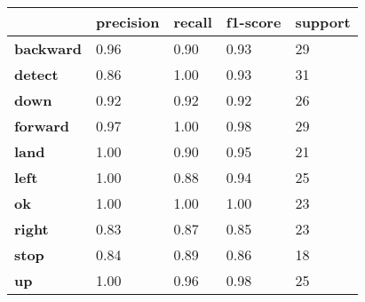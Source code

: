 \begin{table}[htb]
    \centering
    \begin{tabular}{|lllll|}
        \hline
        \multicolumn{1}{|l|}{\textbf{}}             & \multicolumn{1}{l|}{\textbf{precision}} & \multicolumn{1}{l|}{\textbf{recall}} & \multicolumn{1}{l|}{\textbf{f1-score}} & \textbf{support} \\ \hline
        \multicolumn{1}{|l|}{\textbf{backward}}     & \multicolumn{1}{l|}{0.96}               & \multicolumn{1}{l|}{0.90}            & \multicolumn{1}{l|}{0.93}              & 29               \\ \hline
        \multicolumn{1}{|l|}{\textbf{detect}}       & \multicolumn{1}{l|}{0.86}               & \multicolumn{1}{l|}{1.00}            & \multicolumn{1}{l|}{0.93}              & 31               \\ \hline
        \multicolumn{1}{|l|}{\textbf{down}}         & \multicolumn{1}{l|}{0.92}               & \multicolumn{1}{l|}{0.92}            & \multicolumn{1}{l|}{0.92}              & 26               \\ \hline
        \multicolumn{1}{|l|}{\textbf{forward}}      & \multicolumn{1}{l|}{0.97}               & \multicolumn{1}{l|}{1.00}            & \multicolumn{1}{l|}{0.98}              & 29               \\ \hline
        \multicolumn{1}{|l|}{\textbf{land}}         & \multicolumn{1}{l|}{1.00}               & \multicolumn{1}{l|}{0.90}            & \multicolumn{1}{l|}{0.95}              & 21               \\ \hline
        \multicolumn{1}{|l|}{\textbf{left}}         & \multicolumn{1}{l|}{1.00}               & \multicolumn{1}{l|}{0.88}            & \multicolumn{1}{l|}{0.94}              & 25               \\ \hline
        \multicolumn{1}{|l|}{\textbf{ok}}           & \multicolumn{1}{l|}{1.00}               & \multicolumn{1}{l|}{1.00}            & \multicolumn{1}{l|}{1.00}              & 23               \\ \hline
        \multicolumn{1}{|l|}{\textbf{right}}        & \multicolumn{1}{l|}{0.83}               & \multicolumn{1}{l|}{0.87}            & \multicolumn{1}{l|}{0.85}              & 23               \\ \hline
        \multicolumn{1}{|l|}{\textbf{stop}}         & \multicolumn{1}{l|}{0.84}               & \multicolumn{1}{l|}{0.89}            & \multicolumn{1}{l|}{0.86}              & 18               \\ \hline
        \multicolumn{1}{|l|}{\textbf{up}}           & \multicolumn{1}{l|}{1.00}               & \multicolumn{1}{l|}{0.96}            & \multicolumn{1}{l|}{0.98}              & 25               \\ \hline

\end{tabular}
\end{table}
